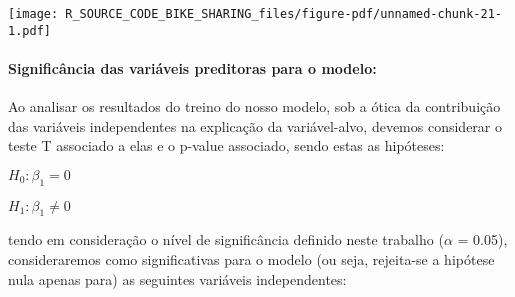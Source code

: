 \documentclass[
  letterpaper,
  DIV=11,
  numbers=noendperiod]{scrartcl}
\let\oldparagraph\paragraph
\renewcommand{\paragraph}[1]{\oldparagraph{#1}\mbox{}}
\begin{document}
\begin{center}
\texttt{[image: R\_SOURCE\_CODE\_BIKE\_SHARING\_files/figure-pdf/unnamed-chunk-21-1.pdf]}
\end{center}

\paragraph{Significância das variáveis preditoras para o
modelo:}\label{significuxe2ncia-das-variuxe1veis-preditoras-para-o-modelo}

Ao analisar os resultados do treino do nosso modelo, sob a ótica da
contribuição das variáveis independentes na explicação da variável-alvo,
devemos considerar o teste T associado a elas e o p-value associado,
sendo estas as hipóteses:

\(H_0: \beta_1 = 0\)

\(H_1: \beta_1 \neq 0\)

tendo em consideração o nível de significância definido neste trabalho
(\(\alpha\) = 0.05), consideraremos como significativas para o modelo
(ou seja, rejeita-se a hipótese nula apenas para) as seguintes variáveis
independentes:
\end{document}
